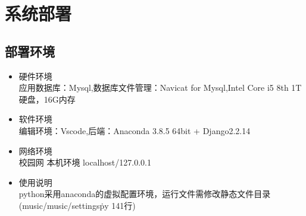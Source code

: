 \documentclass[UTF8,14pt]{article}
\numberwithin{figure}{subsubsection}
\numberwithin{table}{subsubsection}
\begin{document}
\section{系统部署}
\subsection{部署环境}
\begin{itemize}
	\item 硬件环境\\
	      应用数据库：Mysql,数据库文件管理：Navicat for Mysql,Intel Core i5 8th 1T硬盘，16G内存
	\item 软件环境\\
	      编辑环境：Vscode,后端：Anaconda 3.8.5 64bit + Django2.2.14
	\item 网络环境\\
	      校园网 本机环境 localhost/127.0.0.1
	\item 使用说明\\
	      python采用anaconda的虚拟配置环境，运行文件需修改静态文件目录(music/music/settings\.py 141行)
\end{itemize}
\end{document}
